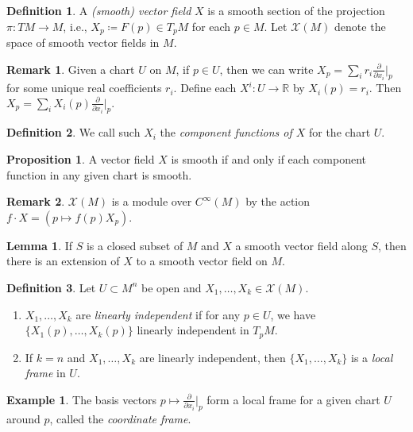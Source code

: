 \documentclass[10pt,letterpaper,cm]{nupset}
\theoremstyle{definition}
\newtheorem*{definition}{Definition}
\newtheorem{exmp}{Example}
\newtheorem{remark}{Remark}
\newtheorem{lemma}{Lemma}
\newtheorem{prop}{Proposition}
\newcommand{\R}{\mathbb R}
\newcommand{\1}{\mathbf{1}}
\newcommand{\0}{\vec 0}
\begin{document}
\begin{definition}
A \textit{(smooth) vector field} $X$ is a smooth section of the projection $\pi : TM \to M$, i.e., $X_p\coloneqq  F(p) \in T_pM$ for each $p \in M$. 
Let $\mathscr{X}(M)$ denote the space of smooth vector fields in $M$.
\end{definition}

\begin{remark}
Given a chart $U$ on $M$, if $p\in U$, then we can write $X_p = \sum_i r_i \frac{\partial}{\partial x_i}\rvert_p$ for some unique real coefficients $r_i$. Define each $X^i : U \to \R$ by $X_i(p) = r_i$. Then $X_p = \sum_i X_i(p) \frac{\partial}{\partial x_i}\rvert_p.$
\end{remark}

\begin{definition}
We call such $X_i$ the \textit{component functions of $X$} for the chart $U$.
\end{definition}

\begin{prop}
A vector field $X$ is smooth if and only if each component function in any given chart is smooth.
\end{prop}

\begin{remark}
$\mathscr{X}(M)$ is a module over $C^{\infty}(M)$ by the action $f \cdot X = (p \mapsto f(p)X_p)$.
\end{remark}

\begin{lemma}
If $S$ is a closed subset of $M$ and $X$ a smooth vector field along $S$, then there is an extension of $X$ to a smooth vector field on $M$.
\end{lemma}

\begin{definition} Let $U \subset M^n$ be open and $X_1, \ldots, X_k \in \mathscr{X}(M)$. 
\begin{enumerate}
\item  $X_1, \ldots, X_k$ are \textit{linearly independent} if for any $p\in U$, we have $\{X_1(p), \ldots, X_k(p)\}$ linearly independent in $T_pM$.
\item If $k=n$ and $X_1, \ldots, X_k$ are linearly independent, then $\{X_1, \ldots, X_k\}$ is a \textit{local frame} in $U$.
\end{enumerate}
\end{definition}

\begin{exmp}
The basis vectors $p\mapsto \frac{\partial}{\partial{x_i}}\rvert_p$ form a local frame for a given chart $U$ around $p$, called the \textit{coordinate frame}.
\end{exmp}
\end{document}
